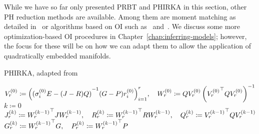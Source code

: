 \begin{remark}
    While we have so far only presented \ac{PRBT} and \ac{PHIRKA} in this section, other \ac{PH} reduction methods are available.
    Among them are moment matching as detailed in~\cite{Polyuga2010} or algorithms based on \ac{OI} such as~\cite{BGD2020} and~\cite{Lee2022}.
    We discuss some more optimization-based \ac{OI} procedures in Chapter~\ref{chap:inferring-models}; however, the focus for these will be on how we can adapt them to allow the application of quadratically embedded manifolds.
\end{remark}

\begin{algorithm}\label{alg:ph-irka}
    \caption{\ac{PHIRKA}, adapted from~\cite[Algorithm~1]{Gugercin2012}}
    $V_r^{(0)} \coloneqq {\left( {(\sigma_i^{(0)} E - (J - R) Q)}\inv (G - P) r_i^{(0)} \right)}_{i = 1}^r,\quad W_r^{(0)} \coloneqq Q V_r^{(0)} \left( {V_r^{(0)}}\trans Q V_r^{(0)} \right)\inv$\;
    $k \coloneqq 0$\;
    $J_r^{(k)} \coloneqq {W_r^{(k - 1)}}^{\top} J W_r^{(k - 1)},\quad R_r^{(k)} \coloneqq {W_r^{(k - 1)}}^{\top} R W_r^{(k - 1)},\quad Q_r^{(k)} \coloneqq {V_r^{(k - 1)}}^{\top} Q V_r^{(k - 1)}$\;
    $G_r^{(k)} \coloneqq {W_r^{(k - 1)}}^{\top} G,\quad P_r^{(k)} \coloneqq {W_r^{(k - 1)}}^{\top} P$\;
\end{algorithm}

